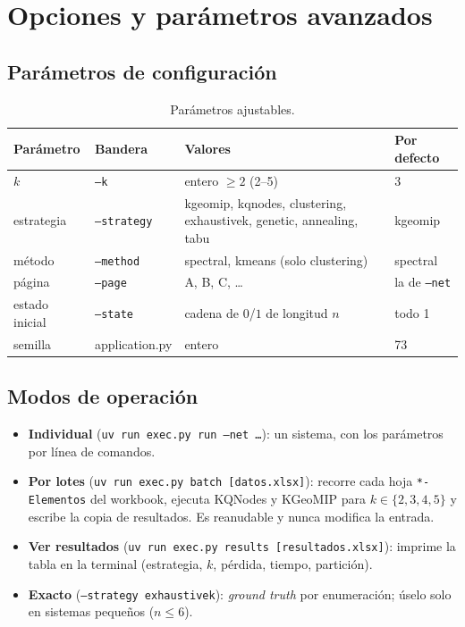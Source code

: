 \documentclass[11pt,letterpaper]{article}
\begin{document}
\section{Opciones y parámetros avanzados}

\subsection{Parámetros de configuración}
\begin{table}[H]
	\centering\small
	\caption{Parámetros ajustables.}
	\begin{tabular}{@{}llll@{}}
		\toprule
		Parámetro      & Bandera             & Valores                                                             & Por defecto          \\
		\midrule
		$k$            & \texttt{--k}        & entero $\ge 2$ (2–5)                                                & 3                    \\
		estrategia     & \texttt{--strategy} & kgeomip, kqnodes, clustering, exhaustivek, genetic, annealing, tabu & kgeomip              \\
		método         & \texttt{--method}   & spectral, kmeans (solo clustering)                                  & spectral             \\
		página         & \texttt{--page}     & A, B, C, \dots                                                      & la de \texttt{--net} \\
		estado inicial & \texttt{--state}    & cadena de $0$/$1$ de longitud $n$                                   & todo 1               \\
		semilla        & application.py      & entero                                                              & 73                   \\
		\bottomrule
	\end{tabular}
\end{table}

\subsection{Modos de operación}
\begin{itemize}
	\item \textbf{Individual} (\texttt{uv run exec.py run --net \dots}): un sistema,
	      con los parámetros por línea de comandos.
	\item \textbf{Por lotes} (\texttt{uv run exec.py batch [datos.xlsx]}): recorre
	      cada hoja \texttt{*-Elementos} del workbook, ejecuta KQNodes y KGeoMIP para
	      $k \in \{2,3,4,5\}$ y escribe la copia de resultados. Es reanudable y nunca
	      modifica la entrada.
	\item \textbf{Ver resultados} (\texttt{uv run exec.py results [resultados.xlsx]}):
	      imprime la tabla en la terminal (estrategia, $k$, pérdida, tiempo, partición).
	\item \textbf{Exacto} (\texttt{--strategy exhaustivek}): \emph{ground truth} por
	      enumeración; úselo solo en sistemas pequeños ($n \le 6$).
\end{itemize}
\end{document}
